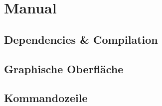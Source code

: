 \section{Manual}
\label{sec:manual}
\subsection{Dependencies \& Compilation}
\subsection{Graphische Oberfläche}
\subsection{Kommandozeile}